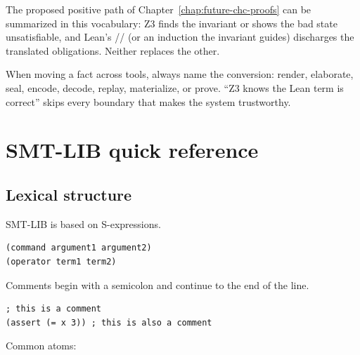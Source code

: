 \documentclass[10pt,letterpaper,oneside]{report}
\newcommand{\code}[1]{\texttt{\detokenize{#1}}}
\begin{document}
The proposed positive path of Chapter~\ref{chap:future-chc-proofs} can be summarized in this vocabulary: Z3 finds the invariant or shows the bad state unsatisfiable, and Lean's \code{omega}/\code{decide}/\code{simp} (or an induction the invariant guides) discharges the translated obligations. Neither replaces the other.

\begin{checkpoint}
When moving a fact across tools, always name the conversion: render, elaborate, seal, encode, decode, replay, materialize, or prove. ``Z3 knows the Lean term is correct'' skips every boundary that makes the system trustworthy.
\end{checkpoint}

\appendix

\chapter{SMT-LIB quick reference}
\label{app:smtlib-reference}

\section{Lexical structure}

SMT-LIB is based on S-expressions.

\begin{lstlisting}[language=SMTLib]
(command argument1 argument2)
(operator term1 term2)
\end{lstlisting}

Comments begin with a semicolon and continue to the end of the line.

\begin{lstlisting}[language=SMTLib]
; this is a comment
(assert (= x 3)) ; this is also a comment
\end{lstlisting}

Common atoms:
\end{document}
